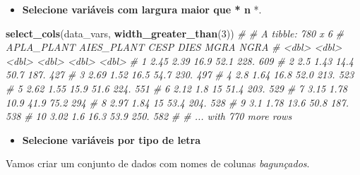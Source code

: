 \documentclass[
]{book}
\newenvironment{Shaded}{\begin{snugshade}}{\end{snugshade}}
\newcommand{\CommentTok}[1]{\textcolor[rgb]{0.56,0.35,0.01}{\textit{#1}}}
\newcommand{\DecValTok}[1]{\textcolor[rgb]{0.00,0.00,0.81}{#1}}
\newcommand{\KeywordTok}[1]{\textcolor[rgb]{0.13,0.29,0.53}{\textbf{#1}}}
\newcommand{\NormalTok}[1]{#1}
\providecommand{\tightlist}{%
  \setlength{\itemsep}{0pt}\setlength{\parskip}{0pt}}
\begin{document}
\begin{itemize}
\tightlist
\item
  \textbf{Selecione variáveis com largura maior que * n }*.
\end{itemize}


\begin{Shaded}
\begin{Highlighting}[]
\KeywordTok{select_cols}\NormalTok{(data_vars, }\KeywordTok{width_greater_than}\NormalTok{(}\DecValTok{3}\NormalTok{))}
\CommentTok{# # A tibble: 780 x 6}
\CommentTok{#    APLA_PLANT AIES_PLANT  CESP  DIES  MGRA  NGRA}
\CommentTok{#         <dbl>      <dbl> <dbl> <dbl> <dbl> <dbl>}
\CommentTok{#  1       2.45       2.39  16.9  52.1 228.    609}
\CommentTok{#  2       2.5        1.43  14.4  50.7 187.    427}
\CommentTok{#  3       2.69       1.52  16.5  54.7 230.    497}
\CommentTok{#  4       2.8        1.64  16.8  52.0 213.    523}
\CommentTok{#  5       2.62       1.55  15.9  51.6 224.    551}
\CommentTok{#  6       2.12       1.8   15    51.4 203.    529}
\CommentTok{#  7       3.15       1.78  10.9  41.9  75.2   294}
\CommentTok{#  8       2.97       1.84  15    53.4 204.    528}
\CommentTok{#  9       3.1        1.78  13.6  50.8 187.    538}
\CommentTok{# 10       3.02       1.6   16.3  53.9 250.    582}
\CommentTok{# # ... with 770 more rows}
\end{Highlighting}
\end{Shaded}

\begin{itemize}
\tightlist
\item
  \textbf{Selecione variáveis por tipo de letra}
\end{itemize}

Vamos criar um conjunto de dados com nomes de colunas \emph{bagunçados}.
\end{document}

